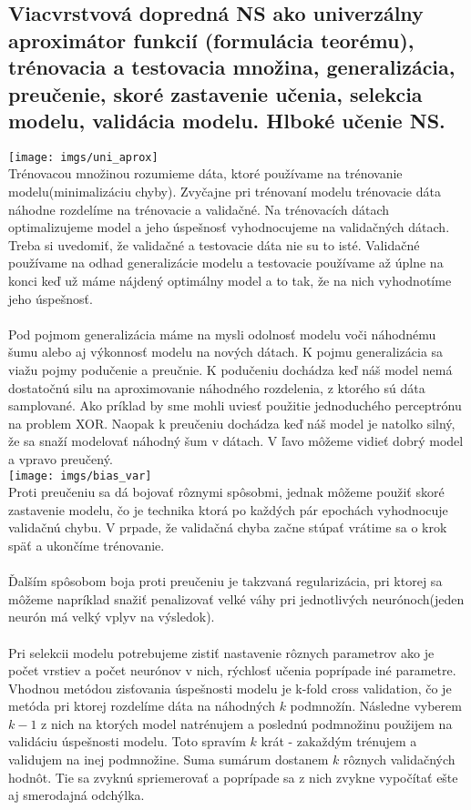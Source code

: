 \documentclass{article}
\numberwithin{equation}{section} %
\begin{document}
\subsection{Viacvrstvová dopredná NS ako univerzálny aproximátor funkcií (formulácia teorému), trénovacia a testovacia množina, generalizácia, preučenie, skoré zastavenie učenia, selekcia modelu, validácia modelu. Hlboké učenie NS.}
\texttt{[image: imgs/uni\_aprox]}\\
Trénovacou množinou rozumieme dáta, ktoré používame na trénovanie modelu(minimalizáciu chyby). Zvyčajne pri trénovaní modelu trénovacie dáta náhodne rozdelíme na trénovacie a validačné. Na trénovacích dátach optimalizujeme model a jeho úspešnosť vyhodnocujeme na validačných dátach. Treba si uvedomiť, že validačné a testovacie dáta nie su to isté. Validačné používame na odhad generalizácie modelu a testovacie používame až úplne na konci keď už máme nájdený optimálny model a to tak, že na nich vyhodnotíme jeho úspešnosť.
\\\\
Pod pojmom generalizácia máme na mysli odolnosť modelu voči náhodnému šumu alebo aj výkonnosť modelu na nových dátach. K pojmu generalizácia sa viažu pojmy podučenie a preučnie. K podučeniu dochádza keď náš model nemá dostatočnú silu na aproximovanie náhodného rozdelenia, z ktorého sú dáta samplované. Ako príklad by sme mohli uviesť použitie jednoduchého perceptrónu na problem XOR. Naopak k preučeniu dochádza keď náš model je natolko silný, že sa snaží modelovať náhodný šum v dátach. V ľavo môžeme vidieť dobrý model a vpravo preučený.\\
\texttt{[image: imgs/bias\_var]}\\
Proti preučeniu sa dá bojovať rôznymi spôsobmi, jednak môžeme použiť skoré zastavenie modelu, čo je technika ktorá po každých pár epochách vyhodnocuje validačnú chybu. V prpade, že validačná chyba začne stúpať vrátime sa o krok späť a ukončíme trénovanie.
\\\\
Ďalším spôsobom boja proti preučeniu je takzvaná regularizácia, pri ktorej sa môžeme napríklad snažiť penalizovať velké váhy pri jednotlivých neurónoch(jeden neurón má velký vplyv na výsledok).
\\\\
Pri selekcii modelu potrebujeme zistiť nastavenie rôznych parametrov ako je počet vrstiev a počet neurónov v nich, rýchlosť učenia poprípade iné parametre. Vhodnou metódou zisťovania úspešnosti modelu je k-fold cross validation, čo je metóda pri ktorej rozdelíme dáta na náhodných $k$ podmnožín. Následne vyberem $k-1$ z nich na ktorých model natrénujem a poslednú podmnožinu použijem na validáciu úspešnosti modelu. Toto spravím $k$ krát - zakaždým trénujem a validujem na inej podmnožine. Suma sumárum dostanem $k$ rôznych validačných hodnôt. Tie sa zvyknú spriemerovať a poprípade sa z nich zvykne vypočítať ešte aj smerodajná odchýlka. 
\end{document}
